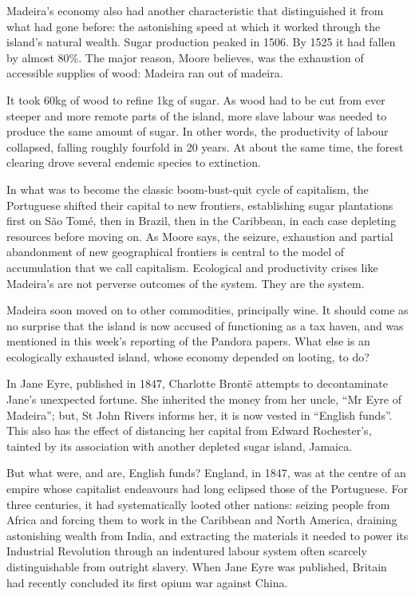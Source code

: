 \documentclass[
]{book}
\begin{document}
Madeira's economy also had another characteristic that distinguished it from what had gone before: the astonishing speed at which it worked through the island's natural wealth. Sugar production peaked in 1506. By 1525 it had fallen by almost 80\%. The major reason, Moore believes, was the exhaustion of accessible supplies of wood: Madeira ran out of madeira.

It took 60kg of wood to refine 1kg of sugar. As wood had to be cut from ever steeper and more remote parts of the island, more slave labour was needed to produce the same amount of sugar. In other words, the productivity of labour collapsed, falling roughly fourfold in 20 years. At about the same time, the forest clearing drove several endemic species to extinction.

In what was to become the classic boom-bust-quit cycle of capitalism, the Portuguese shifted their capital to new frontiers, establishing sugar plantations first on São Tomé, then in Brazil, then in the Caribbean, in each case depleting resources before moving on. As Moore says, the seizure, exhaustion and partial abandonment of new geographical frontiers is central to the model of accumulation that we call capitalism. Ecological and productivity crises like Madeira's are not perverse outcomes of the system. They are the system.

Madeira soon moved on to other commodities, principally wine. It should come as no surprise that the island is now accused of functioning as a tax haven, and was mentioned in this week's reporting of the Pandora papers. What else is an ecologically exhausted island, whose economy depended on looting, to do?

In Jane Eyre, published in 1847, Charlotte Brontë attempts to decontaminate Jane's unexpected fortune. She inherited the money from her uncle, ``Mr Eyre of Madeira''; but, St John Rivers informs her, it is now vested in ``English funds''. This also has the effect of distancing her capital from Edward Rochester's, tainted by its association with another depleted sugar island, Jamaica.

But what were, and are, English funds? England, in 1847, was at the centre of an empire whose capitalist endeavours had long eclipsed those of the Portuguese. For three centuries, it had systematically looted other nations: seizing people from Africa and forcing them to work in the Caribbean and North America, draining astonishing wealth from India, and extracting the materials it needed to power its Industrial Revolution through an indentured labour system often scarcely distinguishable from outright slavery. When Jane Eyre was published, Britain had recently concluded its first opium war against China.
\end{document}
